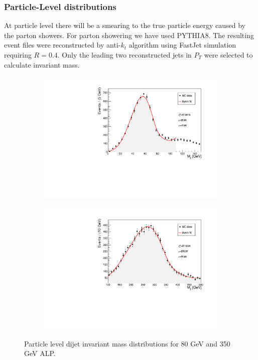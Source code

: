 \documentclass[12pt,a4paper]{article}
\begin{document}
\pagebreak


\subsubsection{Particle-Level distributions}
At particle level there will be a smearing to the true particle energy caused by the parton showers. For parton showering we have used PYTHIA8. The resulting event files were reconstructed by anti-$k_t$ algorithm using FastJet simulation requiring $R = 0.4$. Only the leading two reconstructed jets in $P_T$ were selected to calculate invariant mass.

\begin{figure}[h!]
	\begin{subfigure}{7.4cm}
	\centering\includegraphics[scale=0.4]{particle_level_80_fit.pdf}
	\end{subfigure}
	\begin{subfigure}{7.4cm}
	\centering\includegraphics[scale=0.4]{particle_level_350_fit.pdf}
	\end{subfigure}
\caption{Particle level dijet invariant mass distributions for 80 GeV and 350 GeV ALP.}
\label{fig:figure6}	
\end{figure}
\end{document}
